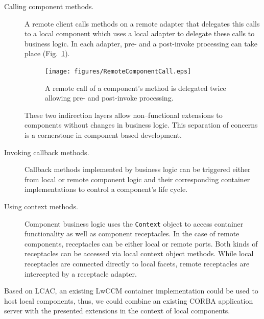 \begin{description}
\item [Calling component methods.]
A remote client calls methods on a remote adapter that delegates this
calls to a local component which uses a local adapter to delegate these calls
to business logic.
In each adapter, pre- and a post-invoke processing can take place 
(Fig.~\ref{RemoteComponentCall}).
\begin{figure}[htbp]
    \begin{center}
    \texttt{[image: figures/RemoteComponentCall.eps]}
    \caption{A remote call of a component's method is delegated twice
    allowing pre- and post-invoke processing.}
    \label{RemoteComponentCall}            
    \end{center}
\end{figure}

These two indirection layers allow non--functional extensions to 
components without changes in business logic. 
This separation of concerns is a cornerstone in component
based development.

\item [Invoking callback methods.]
Callback methods implemented by business logic can be
triggered either from local or remote component logic and their corresponding
container implementations to control a component's life cycle.

\item [Using context methods.]
Component business logic uses the {\tt Context} object to access container
functionality as well as component receptacles.
In the case of remote components, receptacles can be either local or remote
ports. Both kinds of receptacles can be accessed via local context
object methods. While local receptacles are connected directly to local facets,
remote receptacles are intercepted by a receptacle adapter.
\end{description}

\noindent
Based on LCAC, an existing LwCCM container implementation could be used to host 
local components, thus, we could combine an existing CORBA application server 
with the presented extensions in the context of local components. 

